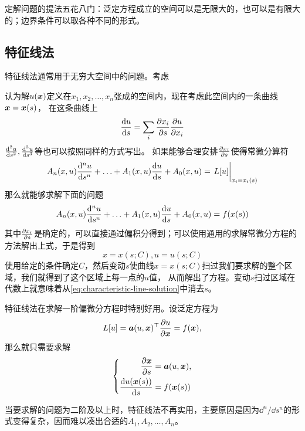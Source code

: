 \documentclass[UTF8]{ctexart}
\begin{document}

定解问题的提法五花八门：泛定方程成立的空间可以是无限大的，也可以是有限大的；边界条件可以取各种不同的形式。

\subsection{特征线法}

特征线法通常用于无穷大空间中的问题。考虑

认为解$u(\vb*{x})$定义在$x_1, x_2, \ldots, x_n$张成的空间内，现在考虑此空间内的一条曲线$\vb*{x} = \vb*{x}(s)$，
在这条曲线上
\[
    \dv{u}{s} = \sum_i \pdv{x_i}{s} \pdv{u}{x_i}
\]
$\dv[2]{u}{s},\dv[3]{u}{s}$等也可以按照同样的方式写出。
如果能够合理安排$\pdv{x_i}{s}$使得常微分算符
\begin{equation}
    A_n (x,u) \dv[n]{u}{s} + \ldots + A_1 (x, u) \dv{u}{s} + A_0(x, u) = \eval{L[u]}_{x_i=x_i(s)}
\end{equation}
那么就能够求解下面的问题
\begin{equation}
    A_n (x,u) \dv[n]{u}{s} + \ldots + A_1 (x, u) \dv{u}{s} + A_0(x, u) = f(x(s))
\end{equation}
其中$\pdv{x_i}{s}$是确定的，可以直接通过偏积分得到；可以使用通用的求解常微分方程的方法解出上式，于是得到
\begin{equation}
    x = x(s;C), u = u(s;C)
    \label{eq:characteristic-line-solution}
\end{equation}
使用给定的条件确定$C$，然后变动$s$使曲线$x=x(s;C)$扫过我们要求解的整个区域，我们就得到了这个区域上每一点的$u$值，
从而解出了方程。变动$s$扫过区域在代数上就意味着从\eqref{eq:characteristic-line-solution}中消去$s$。

特征线法在求解一阶偏微分方程时特别好用。设泛定方程为
\begin{equation}
    L[u] = \vb*{a}(u, \vb*{x})^\top \pdv{u}{\vb*{x}} = f(\vb*{x}),
\end{equation}
那么就只需要求解
\begin{equation}
    \left\{
        \begin{aligned}
            \pdv{\vb*{x}}{s} &= \vb*{a}(u, \vb*{x}), \\
            \dv{u(\vb*{x}(s))}{s} &= f(\vb*{x}(s))
        \end{aligned}
    \right.
\end{equation}

当要求解的问题为二阶及以上时，特征线法不再实用，主要原因是因为$\dd^n / \dd s^n$的形式变得复杂，因而难以凑出合适的$A_1, A_2, \ldots, A_n$。
\end{document}
